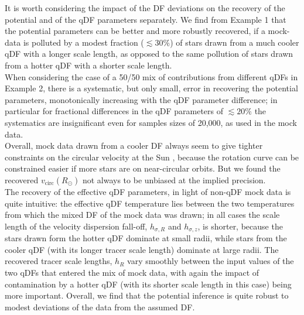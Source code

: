It is worth considering the impact of the DF deviations on the recovery of the potential and of the qDF parameters separately. We find from Example 1 that the potential parameters can be better and more robustly recovered, if a mock-data \MAP{} is polluted by a modest fraction ($\lesssim 30\%$) of stars drawn from a much cooler qDF with a longer scale length, as opposed to the same pollution of stars drawn from a hotter qDF with a shorter scale length. 
\\When considering the case of a 50/50 mix of contributions from different qDFs in Example 2, there is a systematic, but only small, error in recovering the potential parameters, monotonically increasing with the qDF parameter difference; in particular for fractional differences in the qDF parameters of $\lesssim 20\%$ the systematics are insignificant even for samples sizes of 20,000, as used in the mock data. 
\\Overall, mock data drawn from a cooler DF always seem to give tighter constraints on the circular velocity at the Sun , because the rotation curve can be constrained easier if more stars are on near-circular orbits. But we found the recovered $v_\text{circ}(R_\odot)$ not always to be unbiased at the implied precision.
\\The recovery of the effective qDF parameters, in light of non-qDF mock data is quite intuitive: the effective qDF temperature lies between the two temperatures from which the mixed DF of the mock data was drawn; in all cases the scale length of the velocity dispersion fall-off, $h_{\sigma,R}$ and $h_{\sigma,z}$, is shorter, because the stars drawn form the hotter qDF dominate at small radii, while stars from the cooler qDF (with its longer tracer scale length) dominate at large radii. The recovered tracer scale lengths, $h_R$ vary smoothly between the input values of the two qDFs that entered the mix of mock data, with again the impact of contamination by a hotter qDF (with its shorter scale length in this case) being more important. Overall, we find that the potential inference is quite robust to modest deviations of the data from the assumed DF.





